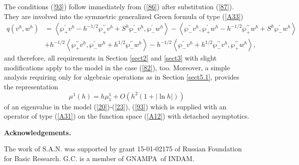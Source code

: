 \documentclass[11pt]{article}%
\numberwithin{equation}{section}
\begin{document}
The conditions (\ref{93}) follow immediately from (\ref{86}) after
substitution (\ref{87}). They are involved into the symmetric generalized
Green formula of type (\ref{A33})%
\begin{align*}
q(v^{h},w^{h})  &  =\left\langle \wp_{+}^{\prime}v^{h}-h^{-1/2}\wp_{+}%
^{\prime\prime}v^{h}+S^{h}\wp_{-}^{\prime}v^{h},\wp_{-}^{\prime}%
w^{h}\right\rangle -\left\langle \wp_{-}^{\prime}v^{h},\wp_{+}^{\prime}%
w^{h}-h^{-1/2}\wp_{+}^{\prime\prime}w^{h}+S^{h}\wp_{-}^{\prime}w^{h}%
\right\rangle \\
&  +h^{-1/2}\left\langle \wp_{+}^{\prime\prime}v^{h},\wp_{-}^{\prime}%
w^{h}+h^{1/2}\wp_{-}^{\prime\prime}w^{h}\right\rangle -h^{-1/2}\left\langle
\wp_{-}^{\prime}v^{h}+h^{1/2}\wp_{-}^{\prime\prime}v^{h},\wp_{+}^{\prime
\prime}w^{h}\right\rangle ,
\end{align*}
and therefore, all requirements in Section \ref{sect2} and \ref{sect3} with
slight modifications apply to the model in the case (\ref{82}), too. Moreover,
a simple analysis requiring only for algebraic operations as in Section
\ref{sect5.1}, provides the representation%
\begin{equation}
\mu^{1}(h)=h\mu_{1}^{1}+O(h^{2}(1+|\ln h|)) \label{94}%
\end{equation}
of an eigenvalue in the model (\ref{20})-(\ref{23}), (\ref{93}) which is
supplied with an operator of type (\ref{A31}) on the function space
(\ref{A12}) with detached asymptotics.

\bigskip

\textbf{Acknowledgements.}

\bigskip

The work of S.A.N. was supported by grant 15-01-02175 of Russian Foundation
for Basic Research. G.C. is a member of GNAMPA\ of INDAM.

\bigskip
\end{document}
